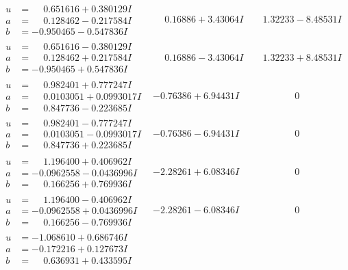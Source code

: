 \documentclass[1p]{elsarticle_modified}
\theoremstyle{definition}
\begin{document}
$$\begin{array}{c|c|c}
\begin{aligned}
u &= \phantom{-}0.651616 + 0.380129 I \\
a &= \phantom{-}0.128462 - 0.217584 I \\
b &= -0.950465 - 0.547836 I\end{aligned}
 & \phantom{-}0.16886 + 3.43064 I & \phantom{-}1.32233 - 8.48531 I \\ \hline\begin{aligned}
u &= \phantom{-}0.651616 - 0.380129 I \\
a &= \phantom{-}0.128462 + 0.217584 I \\
b &= -0.950465 + 0.547836 I\end{aligned}
 & \phantom{-}0.16886 - 3.43064 I & \phantom{-}1.32233 + 8.48531 I \\ \hline\begin{aligned}
u &= \phantom{-}0.982401 + 0.777247 I \\
a &= \phantom{-}0.0103051 + 0.0993017 I \\
b &= \phantom{-}0.847736 - 0.223685 I\end{aligned}
 & -0.76386 + 6.94431 I & \phantom{-0.000000 } 0 \\ \hline\begin{aligned}
u &= \phantom{-}0.982401 - 0.777247 I \\
a &= \phantom{-}0.0103051 - 0.0993017 I \\
b &= \phantom{-}0.847736 + 0.223685 I\end{aligned}
 & -0.76386 - 6.94431 I & \phantom{-0.000000 } 0 \\ \hline\begin{aligned}
u &= \phantom{-}1.196400 + 0.406962 I \\
a &= -0.0962558 - 0.0436996 I \\
b &= \phantom{-}0.166256 + 0.769936 I\end{aligned}
 & -2.28261 + 6.08346 I & \phantom{-0.000000 } 0 \\ \hline\begin{aligned}
u &= \phantom{-}1.196400 - 0.406962 I \\
a &= -0.0962558 + 0.0436996 I \\
b &= \phantom{-}0.166256 - 0.769936 I\end{aligned}
 & -2.28261 - 6.08346 I & \phantom{-0.000000 } 0 \\ \hline\begin{aligned}
u &= -1.068610 + 0.686746 I \\
a &= -0.172216 + 0.127673 I \\
b &= \phantom{-}0.636931 + 0.433595 I\end{aligned}

\end{array}$$
\end{document}
